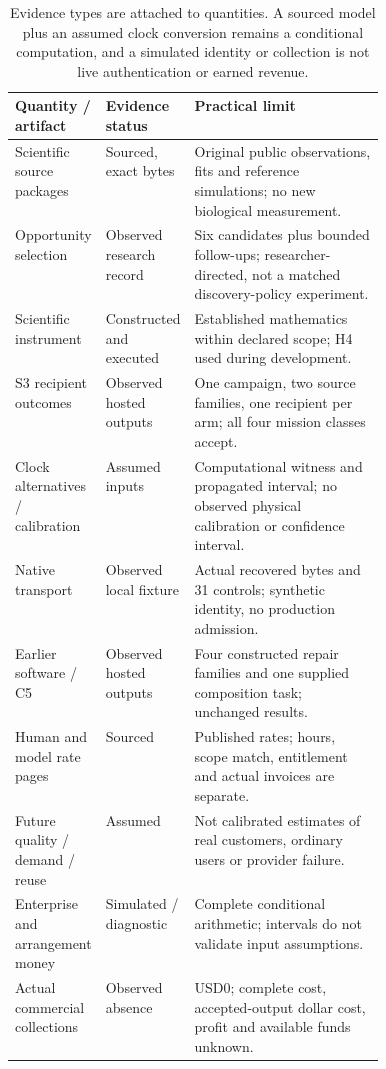 \begin{table}[H]\small
\begin{tabularx}{\linewidth}{@{}p{0.24\linewidth}p{0.19\linewidth}X@{}}\toprule
Quantity / artifact & Evidence status & Practical limit \\ \midrule
Scientific source packages & Sourced, exact bytes & Original public observations, fits and reference simulations; no new biological measurement. \\
Opportunity selection & Observed research record & Six candidates plus bounded follow-ups; researcher-directed, not a matched discovery-policy experiment. \\
Scientific instrument & Constructed and executed & Established mathematics within declared scope; H4 used during development. \\
S3 recipient outcomes & Observed hosted outputs & One campaign, two source families, one recipient per arm; all four mission classes accept. \\
Clock alternatives / calibration & Assumed inputs & Computational witness and propagated interval; no observed physical calibration or confidence interval. \\
Native transport & Observed local fixture & Actual recovered bytes and 31 controls; synthetic identity, no production admission. \\
Earlier software / C5 & Observed hosted outputs & Four constructed repair families and one supplied composition task; unchanged results. \\
Human and model rate pages & Sourced & Published rates; hours, scope match, entitlement and actual invoices are separate. \\
Future quality / demand / reuse & Assumed & Not calibrated estimates of real customers, ordinary users or provider failure. \\
Enterprise and arrangement money & Simulated / diagnostic & Complete conditional arithmetic; intervals do not validate input assumptions. \\
Actual commercial collections & Observed absence & USD0; complete cost, accepted-output dollar cost, profit and available funds unknown. \\ \bottomrule
\end{tabularx}
\caption{Evidence types are attached to quantities. A sourced model plus an assumed clock conversion remains a conditional computation, and a simulated identity or collection is not live authentication or earned revenue.}
\end{table}
